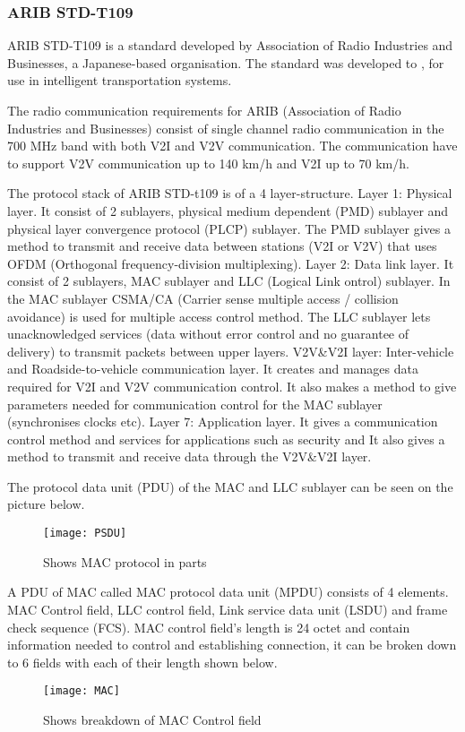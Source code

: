 \subsubsection{ARIB STD-T109}
% 
ARIB STD-T109 is a standard developed by Association of Radio Industries and Businesses, a Japanese-based organisation. The standard was developed to , for use in intelligent transportation systems.\par
% 
The radio communication requirements for ARIB (Association of Radio Industries and Businesses) consist of single channel radio communication in the 700 MHz band with both V2I and V2V communication. The communication have to support V2V communication up to 140 km/h and V2I up to 70 km/h.\par
% 
The protocol stack of ARIB STD-t109 is of a 4 layer-structure.
Layer 1: Physical layer. It consist of 2 sublayers, physical medium dependent (PMD) sublayer and physical layer convergence protocol (PLCP) sublayer. The PMD sublayer gives a method to transmit and receive data between stations (V2I or V2V) that uses OFDM (Orthogonal frequency-division multiplexing).
Layer 2: Data link layer. It consist of 2 sublayers, MAC sublayer and LLC (Logical Link ontrol) sublayer. In the MAC sublayer CSMA/CA (Carrier sense multiple access / collision avoidance) is used for multiple access control method. The LLC sublayer lets unacknowledged services (data without error control and no guarantee of delivery) to transmit packets between upper layers.
V2V\&V2I layer: Inter-vehicle and Roadside-to-vehicle communication layer. It creates and manages data required for V2I and V2V communication control. It also makes a method to give parameters needed for communication control for the MAC sublayer (synchronises clocks etc).
Layer 7: Application layer. It gives a communication control method and services for applications such as security and It also gives a method to transmit and receive data through the V2V\&V2I layer. 
\par
The protocol data unit (PDU) of the MAC and LLC sublayer can be seen on the picture below.
\begin{figure}
    \centering
    \texttt{[image: PSDU]}
    \caption{Shows MAC protocol in parts}
    \label{fig:PSDU}
\end{figure}

A PDU of MAC called MAC protocol data unit (MPDU) consists of 4 elements. MAC Control field, LLC control field, Link service data unit (LSDU) and frame check sequence (FCS).
MAC control field's length is 24 octet and contain information needed to control and  establishing connection, it can be broken down to 6 fields with each of their length shown below.
\begin{figure}
    \centering
    \texttt{[image: MAC]}
    \caption{Shows breakdown of MAC Control field}
    \label{fig:MAC}
\end{figure}


